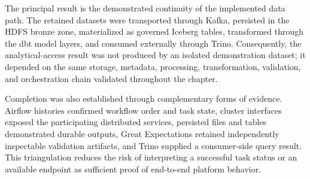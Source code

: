 The principal result is the demonstrated continuity of the implemented data path. The retained datasets were transported through Kafka, persisted in the HDFS bronze zone, materialized as governed Iceberg tables, transformed through the dbt model layers, and consumed externally through Trino. Consequently, the analytical-access result was not produced by an isolated demonstration dataset; it depended on the same storage, metadata, processing, transformation, validation, and orchestration chain validated throughout the chapter.

Completion was also established through complementary forms of evidence. Airflow histories confirmed workflow order and task state, cluster interfaces exposed the participating distributed services, persisted files and tables demonstrated durable outputs, Great Expectations retained independently inspectable validation artifacts, and Trino supplied a consumer-side query result. This triangulation reduces the risk of interpreting a successful task status or an available endpoint as sufficient proof of end-to-end platform behavior.

